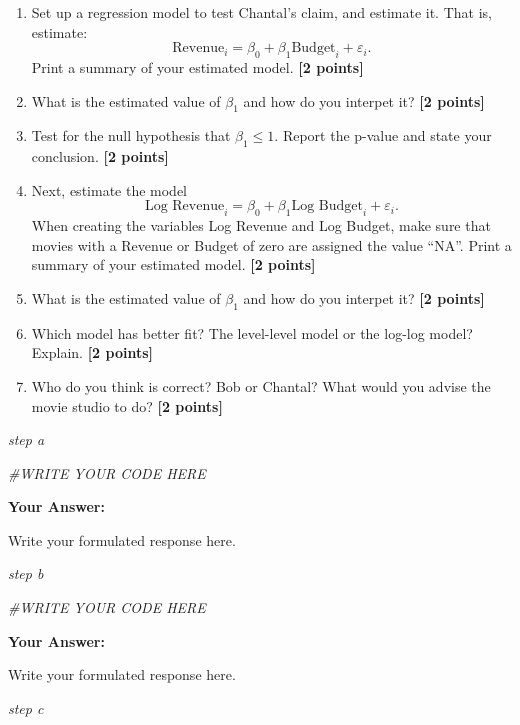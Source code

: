\documentclass[
]{article}
\newenvironment{Shaded}{\begin{snugshade}}{\end{snugshade}}
\newcommand{\CommentTok}[1]{\textcolor[rgb]{0.56,0.35,0.01}{\textit{#1}}}
\providecommand{\tightlist}{%
  \setlength{\itemsep}{0pt}\setlength{\parskip}{0pt}}
\begin{document}
\begin{enumerate}
\def\labelenumi{\alph{enumi}.}
\tightlist
\item
  Set up a regression model to test Chantal's claim, and estimate it.
  That is, estimate:
  \[\text{Revenue}_i=\beta_0+\beta_1 \text{Budget}_i +\varepsilon_i.\]
  Print a summary of your estimated model. \textbf{[2 points]}
\item
  What is the estimated value of \(\beta_1\) and how do you interpet it?
  \textbf{[2 points]}
\item
  Test for the null hypothesis that \(\beta_1 \leq 1\). Report the
  p-value and state your conclusion. \textbf{[2 points]}
\item
  Next, estimate the model
  \[\text{Log Revenue}_i=\beta_0+\beta_1 \text{Log Budget}_i +\varepsilon_i.\]
  When creating the variables Log Revenue and Log Budget, make sure that
  movies with a Revenue or Budget of zero are assigned the value ``NA''.
  Print a summary of your estimated model. \textbf{[2 points]}
\item
  What is the estimated value of \(\beta_1\) and how do you interpet it?
  \textbf{[2 points]}
\item
  Which model has better fit? The level-level model or the log-log
  model? Explain. \textbf{[2 points]}
\item
  Who do you think is correct? Bob or Chantal? What would you advise the
  movie studio to do? \textbf{[2 points]}
\end{enumerate}

\emph{step a}

\begin{Shaded}
\begin{Highlighting}[]
\CommentTok{\#WRITE YOUR CODE HERE}
\end{Highlighting}
\end{Shaded}

\textbf{Your Answer:}

Write your formulated response here.

\emph{step b}

\begin{Shaded}
\begin{Highlighting}[]
\CommentTok{\#WRITE YOUR CODE HERE}
\end{Highlighting}
\end{Shaded}

\textbf{Your Answer:}

Write your formulated response here.

\emph{step c}
\end{document}
